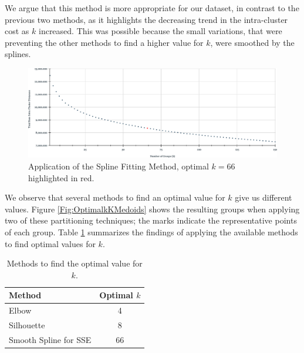 We argue that this method is more appropriate for our dataset, in contrast to the previous two methods, as it highlights the decreasing trend in the intra-cluster cost as $k$ increased. This was possible because the small variations, that were preventing the other methods to find a higher value for $k$, were smoothed by the splines.

\begin{figure}[h]
	\centering
	\includegraphics[scale=0.5]{../Figures/SmoothSpline-kMedoids}
	\caption{Application of the Spline Fitting Method, optimal $k=66$ highlighted in red.}
	\label{Fig:SmoothSpline-kMedoids}
\end{figure}

We observe that several methods to find an optimal value for $k$ give us different values. Figure \ref{Fig:OptimalkKMedoids} shows the resulting groups when applying two of these partitioning techniques; the marks indicate the representative points of each group. 
Table \ref{Table:ValidationIndex} summarizes the findings of applying the available methods to find optimal values for $k$.
\begin{table}[h]
	\centering
	\small
	\begin{tabular}{|l|c|}
		\hline
		Method & Optimal $k$ \\ \hline
		Elbow  & 4	\\
		Silhouette & 8	\\
		Smooth Spline for SSE & 66\\ \hline
	\end{tabular}
\caption{Methods to find the optimal value for $k$.}
\label{Table:ValidationIndex}
\end{table}
		
